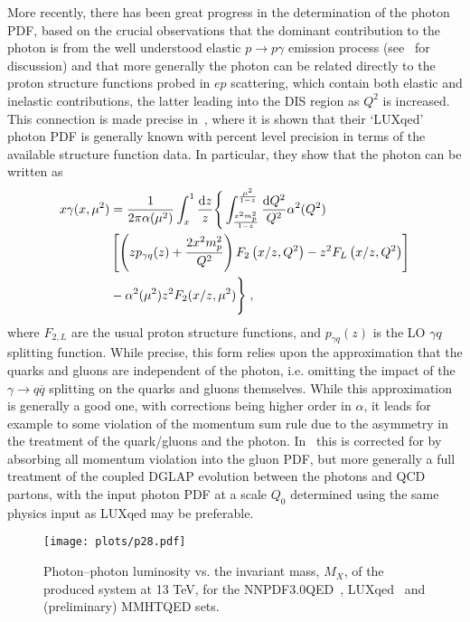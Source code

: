 \documentclass{appolb}
\begin{document}
More recently, there has been great progress in the determination of the photon PDF, based on the crucial observations that the dominant contribution to the photon is from the well understood elastic $p\to p\gamma$ emission process (see~\cite{Harland-Lang:2016kog} for discussion) and that more generally the photon can be related directly to the proton structure functions probed in $ep$ scattering, which contain both elastic and inelastic contributions, the latter leading into the DIS region as $Q^2$ is increased. This connection is made precise in~\cite{Manohar:2016nzj}, where it is shown that their `LUXqed' photon PDF is generally known with percent level precision in terms of the available structure function data. In particular, they show that the photon can be written as
\begin{align}\nonumber
x\gamma(x,\mu^2)&=\frac{1}{2\pi\alpha(\mu^2)}\int_x^1\frac{{\rm d}z}{z}\Bigg\{\int^{\frac{\mu^2}{1-z}}_{\frac{x^2m_p^2}{1-z}} \frac{{\rm d}Q^2}{Q^2}\alpha^2(Q^2)\\ \nonumber
&\left[\left(zp_{\gamma q}(z)+\frac{2x^2 m_p^2}{Q^2}\right)F_2\left(x/z,Q^2\right)-z^2 F_L\left(x/z,Q^2\right)\right]\\ \label{lux}
&-\alpha^2(\mu^2)z^2 F_2(x/z,\mu^2)\Bigg\}\;,
\end{align}
where $F_{2,L}$ are the usual proton structure functions, and $p_{\gamma q}(z)$ is the LO $\gamma q$ splitting function. While precise, this form relies upon the approximation that the quarks and gluons are independent of the photon, i.e. omitting the impact of the $\gamma \to q\overline{q}$ splitting on the quarks and gluons themselves. While this approximation is generally a good one, with corrections being higher order in $\alpha$, it leads for example to some violation of the momentum sum rule due to the asymmetry in the treatment of the quark/gluons and the photon. In~\cite{Manohar:2016nzj} this is corrected for by absorbing all momentum violation into the gluon PDF, but more generally a full treatment of the coupled DGLAP evolution between the photons and QCD partons, with the input photon PDF at a scale $Q_0$ determined using the same physics input as LUXqed may be preferable. 

\begin{figure}[htb]
\centerline{%
\texttt{[image: plots/p28.pdf]}}
\caption{Photon--photon luminosity vs. the invariant mass, $M_X$, of the produced system at 13 TeV, for the NNPDF3.0QED~\cite{Ball:2013hta}, LUXqed~\cite{Manohar:2016nzj} and (preliminary) MMHTQED sets.}
\label{fig:gampdf}
\end{figure}
\end{document}
